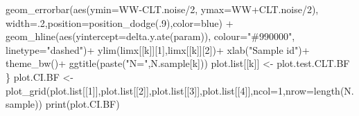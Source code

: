 \documentclass[
]{book}
\newenvironment{Shaded}{\begin{snugshade}}{\end{snugshade}}
\newcommand{\AttributeTok}[1]{\textcolor[rgb]{0.77,0.63,0.00}{#1}}
\newcommand{\DecValTok}[1]{\textcolor[rgb]{0.00,0.00,0.81}{#1}}
\newcommand{\FunctionTok}[1]{\textcolor[rgb]{0.00,0.00,0.00}{#1}}
\newcommand{\NormalTok}[1]{#1}
\newcommand{\OtherTok}[1]{\textcolor[rgb]{0.56,0.35,0.01}{#1}}
\newcommand{\SpecialCharTok}[1]{\textcolor[rgb]{0.00,0.00,0.00}{#1}}
\newcommand{\StringTok}[1]{\textcolor[rgb]{0.31,0.60,0.02}{#1}}
\theoremstyle{definition}
\theoremstyle{definition}
\theoremstyle{definition}
\theoremstyle{definition}
\theoremstyle{remark}
\begin{document}
\begin{Shaded}
\begin{Highlighting}[]
      \FunctionTok{geom\_errorbar}\NormalTok{(}\FunctionTok{aes}\NormalTok{(}\AttributeTok{ymin=}\NormalTok{WW}\SpecialCharTok{{-}}\NormalTok{CLT.noise}\SpecialCharTok{/}\DecValTok{2}\NormalTok{, }\AttributeTok{ymax=}\NormalTok{WW}\SpecialCharTok{+}\NormalTok{CLT.noise}\SpecialCharTok{/}\DecValTok{2}\NormalTok{), }\AttributeTok{width=}\NormalTok{.}\DecValTok{2}\NormalTok{,}\AttributeTok{position=}\FunctionTok{position\_dodge}\NormalTok{(.}\DecValTok{9}\NormalTok{),}\AttributeTok{color=}\StringTok{\textquotesingle{}blue\textquotesingle{}}\NormalTok{) }\SpecialCharTok{+}
      \FunctionTok{geom\_hline}\NormalTok{(}\FunctionTok{aes}\NormalTok{(}\AttributeTok{yintercept=}\FunctionTok{delta.y.ate}\NormalTok{(param)), }\AttributeTok{colour=}\StringTok{"\#990000"}\NormalTok{, }\AttributeTok{linetype=}\StringTok{"dashed"}\NormalTok{)}\SpecialCharTok{+}
      \FunctionTok{ylim}\NormalTok{(limx[[k]][}\DecValTok{1}\NormalTok{],limx[[k]][}\DecValTok{2}\NormalTok{])}\SpecialCharTok{+}
      \FunctionTok{xlab}\NormalTok{(}\StringTok{"Sample id"}\NormalTok{)}\SpecialCharTok{+}
      \FunctionTok{theme\_bw}\NormalTok{()}\SpecialCharTok{+}
      \FunctionTok{ggtitle}\NormalTok{(}\FunctionTok{paste}\NormalTok{(}\StringTok{"N="}\NormalTok{,N.sample[k]))}
\NormalTok{  plot.list[[k]] }\OtherTok{\textless{}{-}}\NormalTok{ plot.test.CLT.BF}
\NormalTok{\}}
\NormalTok{plot.CI.BF }\OtherTok{\textless{}{-}} \FunctionTok{plot\_grid}\NormalTok{(plot.list[[}\DecValTok{1}\NormalTok{]],plot.list[[}\DecValTok{2}\NormalTok{]],plot.list[[}\DecValTok{3}\NormalTok{]],plot.list[[}\DecValTok{4}\NormalTok{]],}\AttributeTok{ncol=}\DecValTok{1}\NormalTok{,}\AttributeTok{nrow=}\FunctionTok{length}\NormalTok{(N.sample))}
\FunctionTok{print}\NormalTok{(plot.CI.BF)}


\end{Highlighting}
\end{Shaded}
\end{document}
